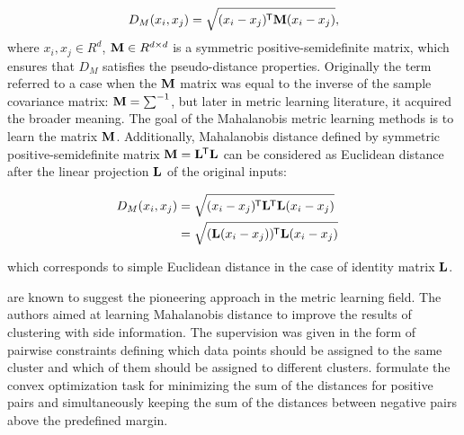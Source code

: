 \begin{equation}
\label{eq:mahalanobis}
    D_M(x_i, x_j) = \sqrt{(x_i - x_j)^{\mkern-1.5mu\mathsf{T}} \bold{M} (x_i - x_j)},
\end{equation}
where $x_i, x_j \in R^d$, $\bold{M} \in R^{d\times d}$ is a symmetric positive-semidefinite matrix, which ensures that $D_M$ satisfies the pseudo-distance properties. Originally \citep{chandra1936generalised} the term referred to a case when the $\bold{M}$ matrix was equal to the inverse of the sample covariance matrix: $\bold{M} = \sum^{-1}$, but later in metric learning literature, it acquired the broader meaning. 
The goal of the Mahalanobis metric learning methods is to learn the matrix $\bold{M}$. 
Additionally, Mahalanobis distance defined by symmetric positive-semidefinite matrix $\bold{M} = \bold{L}^{\mkern-1.5mu\mathsf{T}} \bold{L}$ can be considered as Euclidean distance after the linear projection $\bold{L}$ of the original inputs:



\begin{equation}
  \begin{aligned}
  \label{eq:mahalanobis_l}
    D_M(x_i, x_j) & = \sqrt{(x_i - x_j)^{\mkern-1.5mu\mathsf{T}} \bold{L}^{\mkern-1.5mu\mathsf{T}} \bold{L} (x_i - x_j)} & \\
      & = \sqrt{(\bold{L}(x_i - x_j))^{\mkern-1.5mu\mathsf{T}} \bold{L} (x_i - x_j)} & \\
  \end{aligned}
\end{equation}

which corresponds to simple Euclidean distance in the case of identity matrix $\bold{L}$.


\citep{xing2003distance} are known to suggest the pioneering approach in the metric learning field. The authors aimed at learning Mahalanobis distance to improve the results of clustering with side information. The supervision was given in the form of pairwise constraints defining which data points should be assigned to the same cluster and which of them should be assigned to different clusters. \citep{xing2003distance} formulate the convex optimization task for minimizing the sum of the distances for positive pairs and simultaneously keeping the sum of the distances between negative pairs above the predefined margin. %

